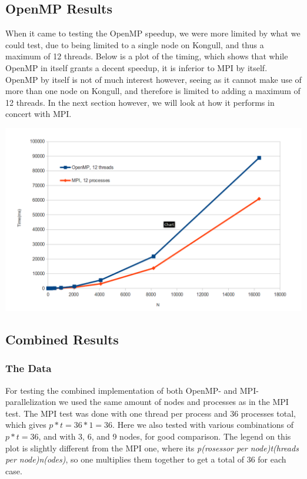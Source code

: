 \documentclass[fontsize=11pt,paper=a4,titlepage]{article}
\begin{document}
\subsection{OpenMP Results}

When it came to testing the OpenMP speedup, we were more limited by what we
could test, due to being limited to a single node on Kongull, and thus a maximum
of 12 threads. Below is a plot of the timing, which shows that while OpenMP in
itself grants a decent speedup, it is inferior to MPI by itself. OpenMP by
itself is not of much interest however, seeing as it cannot make use of more
than one node on Kongull, and therefore is limited to adding a maximum of 12
threads. In the next section however, we will look at how it performs in concert
with MPI.

\hspace*{-1.7cm}\includegraphics[scale=0.6]{pics/omp.png}
\newpage
\subsection{Combined Results}
\subsubsection{The Data}

For testing the combined implementation of both OpenMP- and MPI-parallelization
we used the same amount of nodes and processes as in the MPI test. The MPI test
was done with one thread per process and 36 processes total, which gives $p*t =
36*1 = 36$. Here we also tested with various combinations of $p*t=36$, and with
3, 6, and 9 nodes, for good comparison. The legend on this plot is slightly
different from the MPI one, where its \emph{p(rosessor per node)t(hreads per
node)n(odes)}, so one multiplies them together to get a total of 36 for each
case.
\end{document}
